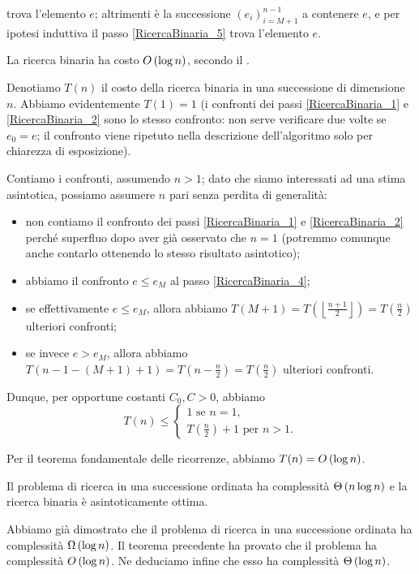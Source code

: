 trova l'elemento $e$; altrimenti \`e la successione
$(e_i)_{i = M + 1}^{n - 1}$ a contenere $e$, e per ipotesi induttiva
il passo \ref{RicercaBinaria_5} trova l'elemento $e$. \EndProof
\begin{Theorem}
  La ricerca binaria ha costo $O \left ( \log n \right )$, secondo il .
\end{Theorem}
\Proof Denotiamo $T(n)$ il costo della ricerca binaria in una successione di
dimensione $n$. Abbiamo evidentemente $T(1) = 1$ (i confronti dei passi
\ref{RicercaBinaria_1} e \ref{RicercaBinaria_2} sono lo stesso confronto: non
serve verificare due volte se $e_0 = e$; il confronto viene ripetuto nella
descrizione dell'algoritmo solo per chiarezza di esposizione).
\par Contiamo i confronti, assumendo $n > 1$; dato che siamo interessati ad una
stima asintotica, possiamo assumere $n$ pari senza perdita di generalit\`a:
\begin{itemize}
  \item non contiamo il confronto dei passi \ref{RicercaBinaria_1} e
    \ref{RicercaBinaria_2} perch\'e superfluo dopo aver gi\`a osservato
    che $n = 1$ (potremmo comunque anche contarlo ottenendo lo stesso risultato
    asintotico);
  \item abbiamo il confronto $e \leq e_M$ al passo \ref{RicercaBinaria_4};
  \item se effettivamente $e \leq e_M$, allora abbiamo
    $T(M + 1) = T \left ( \left \lfloor \frac{n + 1}{2} \right \rfloor \right )
      = T \left ( \frac{n}{2} \right )$
    ulteriori confronti;
  \item se invece $e > e_M$, allora abbiamo
    $T(n - 1 - (M + 1) + 1) = T \left ( n - \frac{n}{2} \right )
      = T \left ( \frac{n}{2} \right )$
    ulteriori confronti.
\end{itemize}
\par Dunque, per opportune costanti $C_0, C > 0$, abbiamo
\[
	T(n) \leq
	\begin{cases}
		1\text{ se }n = 1,\\
		T(\frac{n}{2}) + 1\text{ per } n > 1.
	\end{cases}
\]
\par Per il teorema fondamentale delle ricorrenze, abbiamo
$T(n) = O \left ( \log n \right )$. \EndProof
\begin{Corollary}
	Il problema di ricerca in una successione ordinata ha complessit\`a
  $\Theta \left ( n \log n \right )$ e la ricerca binaria \`e asintoticamente ottima.
\end{Corollary}
\Proof Abbiamo gi\`a dimostrato che il problema di ricerca in una successione
ordinata  ha complessit\`a
$\Omega \left ( \log n \right )$.
Il teorema precedente ha provato che il problema ha complessit\`a
$O \left ( \log n \right )$.
Ne deduciamo infine che esso ha complessit\`a $\Theta \left ( \log n \right )$. \EndProof
